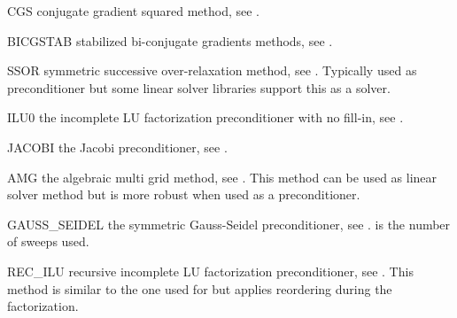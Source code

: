 \begin{memberdesc}[SolverOptions]{CGS}
conjugate gradient squared method, see .
\end{memberdesc}

\begin{memberdesc}[SolverOptions]{BICGSTAB}
stabilized bi-conjugate gradients methods, see .
\end{memberdesc}

\begin{memberdesc}[SolverOptions]{SSOR}
symmetric successive over-relaxation method, see .
Typically used as preconditioner but some linear solver libraries support
this as a solver.
\end{memberdesc}

\begin{memberdesc}[SolverOptions]{ILU0}
the incomplete LU factorization preconditioner with no fill-in, see .
\end{memberdesc}

\begin{memberdesc}[SolverOptions]{JACOBI}
the Jacobi preconditioner, see .
\end{memberdesc}

\begin{memberdesc}[SolverOptions]{AMG}
the algebraic multi grid method, see . This method can be used as
linear solver method but is more robust when used as a preconditioner.
\end{memberdesc}

\begin{memberdesc}[SolverOptions]{GAUSS_SEIDEL}
the symmetric Gauss-Seidel preconditioner, see .
 is the number of sweeps used.
\end{memberdesc}


\begin{memberdesc}[SolverOptions]{REC_ILU}
recursive incomplete LU factorization preconditioner, see .
This method is similar to the one used for \ILU but applies reordering during
the factorization.
\end{memberdesc}


